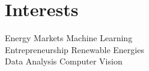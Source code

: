 \section{Interests \faBook}
Energy Markets \textbullet{} Machine Learning\\ 
Entrepreneurship \textbullet{} Renewable Energies\\
Data Analysis \textbullet{} Computer Vision
\sectionsep